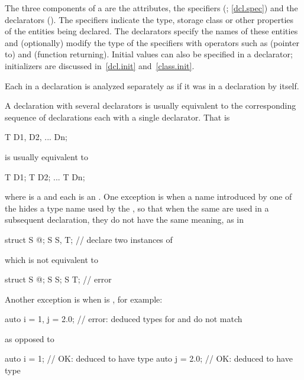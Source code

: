 \pnum
The three components of a
are the
attributes, the
specifiers
(;
\ref{dcl.spec}) and the declarators
().
The specifiers indicate the type, storage class or other properties of
the entities being declared.
The declarators specify the names of these entities
and (optionally) modify the type of the specifiers with operators such as
\tcode{*}
(pointer
to)
and
\tcode{()}
(function returning).
Initial values can also be specified in a declarator;
initializers are discussed in~\ref{dcl.init} and~\ref{class.init}.

\pnum
Each
in a declaration is analyzed separately as if it was in a declaration by itself.
\begin{note}
A declaration with several declarators is usually equivalent to the corresponding
sequence of declarations each with a single declarator. That is
\begin{codeblock}
T D1, D2, ... Dn;
\end{codeblock}
is usually equivalent to
\begin{codeblock}
T D1; T D2; ... T Dn;
\end{codeblock}
where  is a 
and each  is an .
One exception is when a name introduced by one of the
 hides a type name used by the
, so that when the same
 are used in a subsequent declaration,
they do not have the same meaning, as in
\begin{codeblock}
struct S { @\commentellip@ };
S S, T;                 // declare two instances of 
\end{codeblock}
which is not equivalent to
\begin{codeblock}
struct S { @\commentellip@ };
S S;
S T;                    // error
\end{codeblock}
Another exception is when  is ,
for example:
\begin{codeblock}
auto i = 1, j = 2.0;    // error: deduced types for  and  do not match
\end{codeblock}
as opposed to
\begin{codeblock}
auto i = 1;             // OK:  deduced to have type 
auto j = 2.0;           // OK:  deduced to have type 
\end{codeblock}
\end{note}


